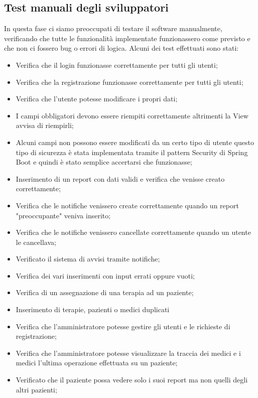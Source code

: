 \documentclass[a4paper]{article}
\begin{document}
\subsection{Test manuali degli sviluppatori}

In questa fase ci siamo preoccupati di testare il software manualmente,
verificando che tutte le funzionalità implementate funzionassero come previsto e che non ci fossero bug o errori di logica.
Alcuni dei test effettuati sono stati:
\begin{itemize}
  \item Verifica che il login funzionasse correttamente per tutti gli utenti;
  \item Verifica che la registrazione funzionasse correttamente per tutti gli utenti;
  \item Verifica che l'utente potesse modificare i propri dati;
  \item I campi obbligatori devono essere riempiti correttamente
  altrimenti la View avvisa di riempirli;
  \item Alcuni campi non possono essere modificati da un certo tipo di utente 
  questo tipo di sicurezza è stata implementata tramite il pattern Security di Spring Boot
  e quindi è stato semplice accertarsi che funzionasse;
  \item Inserimento di un report con dati validi e verifica che venisse creato correttamente;
  \item Verifica che le notifiche venissero create correttamente quando un report 
  "preoccupante" veniva inserito;
  \item Verifica che le notifiche venissero cancellate 
  correttamente quando un utente le cancellava;
  \item Verificato il sistema di avvisi tramite notifiche;
  \item Verifica dei vari inserimenti con input errati oppure vuoti;
  \item Verifica di un assegnazione di una terapia ad un paziente;
  \item Inserimento di terapie, pazienti o medici duplicati
  \item Verifica che l'amministratore potesse gestire gli utenti e le richieste di registrazione;
  \item Verifica che l'amministratore potesse visualizzare la traccia dei medici e i medici l'ultima 
  operazione effettuata su un paziente;
  \item Verificato che il paziente possa vedere solo i suoi report ma non quelli degli altri pazienti;
\end{itemize}
\end{document}

